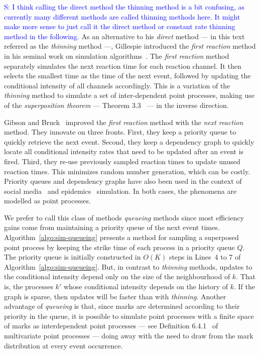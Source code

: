 \documentclass{juliacon}
\newcommand{\comment}[1]{\textcolor{blue}{#1}}
\begin{document}
\comment{S: I think calling the direct method the thinning method is a bit confusing, as currently many different methods are called thinning methods here. It might make more sense to just call it the direct method or constant rate thinning method in the following.}
As an alternative to his \textit{direct} method --- in this text referred as the \textit{thinning} method ---, Gillespie introduced the \textit{first reaction} method in his seminal work on simulation algorithms~\cite{gillespie1976}. The \textit{first reaction} method separately simulates the next reaction time for each reaction channel. It then selects the smallest time as the time of the next event, followed by updating the conditional intensity of all channels accordingly. This is a variation of the \textit{thinning} method to simulate a set of inter-dependent point processes, making use of the \textit{superposition theorem} --- Theorem 3.3~\cite{last2017} --- in the inverse direction.

Gibson and Bruck~\cite{gibson2000} improved the \textit{first reaction} method with the \textit{next reaction} method. They innovate on three fronts. First, they keep a priority queue to quickly retrieve the next event. Second, they keep a dependency graph to quickly locate all conditional intensity rates that need to be updated after an event is fired. Third, they re-use previously sampled reaction times to update unused reaction times. This minimizes random number generation, which can be costly. Priority queues and dependency graphs have also been used in the context of social media~\cite{farajtabar2017} and epidemics~\cite{holme2021} simulation. In both cases, the phenomena are modelled as point processes.

We prefer to call this class of methods \textit{queueing} methods since most efficiency gains come from maintaining a priority queue of the next event times. Algorithm~\ref{algo:sim-queueing} presents a method for sampling a superposed point process by keeping the strike time of each process in a priority queue \( Q \). The priority queue is initially constructed in \( O(K) \) steps in Lines~4 to 7 of Algorithm~\ref{algo:sim-queueing}. But, in contrast to \textit{thinning} methods, updates to the conditional intensity depend only on the size of the neighbourhood of \( k \). That is, the processes \( k' \) whose conditional intensity depends on the history of \( k \). If the graph is sparse, then updates will be faster than with \textit{thinning}. Another advantage of \textit{queueing} is that, since marks are determined according to their priority in the queue, it is possible to simulate point processes with a finite space of marks as interdependent point processes --- see Definition 6.4.1~\cite{daley2003} of multivariate point processes --- doing away with the need to draw from the mark distribution at every event occurrence.
\end{document}
